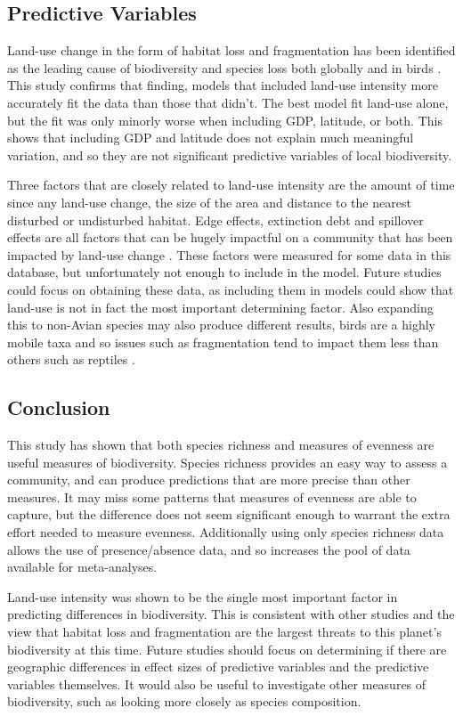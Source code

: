 \documentclass[11pt]{article}
\begin{document}
\subsection{Predictive Variables}

Land-use change in the form of habitat loss and fragmentation has been identified as the leading cause of biodiversity and species loss both globally and in birds \parencite{Gaston2003,Dirzo2004}. This study confirms that finding, models that included land-use intensity more accurately fit the data than those that didn't. The best model fit land-use alone, but the fit was only minorly worse when including GDP, latitude, or both. This shows that including GDP and latitude does not explain much meaningful variation, and so they are not significant predictive variables of local biodiversity. 

Three factors that are closely related to land-use intensity are the amount of time since any land-use change, the size of the area and distance to the nearest disturbed or undisturbed habitat. Edge effects, extinction debt and spillover effects are all factors that can be hugely impactful on a community that has been impacted by land-use change \parencite{Banks-Leite2010, Ford2009, Robinson1995}. These factors were measured for some data in this database, but unfortunately not enough to include in the model. Future studies could focus on obtaining these data, as including them in models could show that land-use is not in fact the most important determining factor. Also expanding this to non-Avian species may also produce different results, birds are a highly mobile taxa and so issues such as fragmentation tend to impact them less than others such as reptiles \parencite{Keinath2017, Villard1994}.

\subsection*{\Large Conclusion}
This study has shown that both species richness and measures of evenness are useful measures of biodiversity. Species richness provides an easy way to assess a community, and can produce predictions that are more precise than other measures. It may miss some patterns that measures of evenness are able to capture, but the difference does not seem significant enough to warrant the extra effort needed to measure evenness. Additionally using only species richness data allows the use of presence/absence data, and so increases the pool of data available for meta-analyses. 

Land-use intensity was shown to be the single most important factor in predicting differences in biodiversity. This is consistent with other studies and the view that habitat loss and fragmentation are the largest threats to this planet's biodiversity at this time. Future studies should focus on determining if there are geographic differences in effect sizes of predictive variables and the predictive variables themselves. It would also be useful to investigate other measures of biodiversity, such as looking more closely as species composition.

\newpage

\printbibliography
\end{document}
